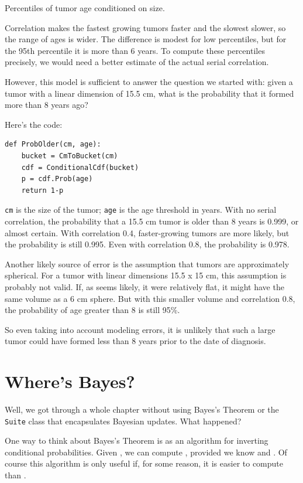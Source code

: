 \documentclass[12pt]{book}
\begin{document}
\begin{table}

\caption{Percentiles of tumor age conditioned on size.}
\end{table}

Correlation makes the fastest growing tumors faster and the slowest
slower, so the range of ages is wider.  The difference is modest for
low percentiles, but for the 95th percentile it is more than 6 years.
To compute these percentiles precisely, we would need a better
estimate of the actual serial correlation.

However, this model is sufficient to answer the question
we started with: given a tumor with a linear dimension of
15.5 cm, what is the probability that it formed more than
8 years ago?

Here's the code:

\begin{verbatim}
def ProbOlder(cm, age):
    bucket = CmToBucket(cm)
    cdf = ConditionalCdf(bucket)
    p = cdf.Prob(age)
    return 1-p
\end{verbatim}

{\tt cm} is the size of the tumor; {\tt age} is the age threshold
in years.  With no serial correlation, the probability that a
15.5 cm tumor is older than 8 years is 0.999, or almost certain.
With correlation 0.4, faster-growing tumors are more likely, but
the probability is still 0.995.  Even with correlation 0.8, the
probability is 0.978.

Another likely source of error is the assumption that tumors are
approximately spherical.  For a tumor with linear dimensions 15.5 x 15
cm, this assumption is probably not valid.  If, as seems likely, it
were relatively flat, it might have the same volume as a 6 cm sphere.
But with this smaller volume and correlation 0.8, the probability of age
greater than 8 is still 95\%.

So even taking into account modeling errors, it is unlikely that such
a large tumor could have formed less than 8 years prior to the date of
diagnosis.


\section{Where's Bayes?}

Well, we got through a whole chapter without using Bayes's Theorem or
the {\tt Suite} class that encapsulates Bayesian updates.  What
happened?

One way to think about Bayes's Theorem is as an algorithm for
inverting conditional probabilities.  Given , we can compute
, provided we know  and .  Of course this algorithm
is only useful if, for some reason, it is easier to compute 
than .
\end{document}
